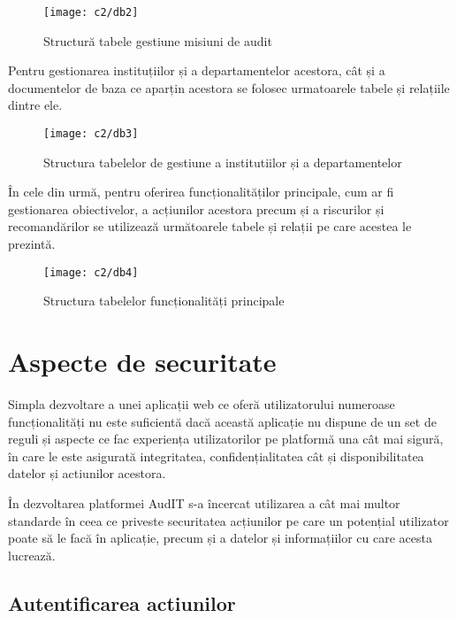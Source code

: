 \vspace{1cm}
\begin{figure}[h]
	\centering
	
	\texttt{[image: c2/db2]}
	\caption{Structură tabele gestiune misiuni de audit}
\end{figure}

\newpage
Pentru gestionarea instituțiilor și a departamentelor acestora, cât și a documentelor de baza ce aparțin acestora se folosec urmatoarele tabele și relațiile dintre ele.
\vspace{1cm}
\begin{figure}[h]
	\centering
	
	\texttt{[image: c2/db3]}
	\caption{Structura tabelelor de gestiune a institutiilor și a departamentelor}
\end{figure}

În cele din urmă, pentru oferirea funcționalităților principale, cum ar fi gestionarea obiectivelor, a acțiunilor acestora precum și a riscurilor și recomandărilor se utilizează următoarele tabele și relații pe care acestea le prezintă.

\vspace{1cm}
\begin{figure}[h]
	\centering
	
	\texttt{[image: c2/db4]}
	\caption{Structura tabelelor funcționalități principale}
\end{figure}

\section{Aspecte de securitate}

Simpla dezvoltare a unei aplicații web ce oferă utilizatorului numeroase funcționalități nu este suficientă dacă această aplicație nu dispune de un set de reguli și aspecte ce  fac experiența utilizatorilor pe platformă una cât mai sigură, în care le este asigurată integritatea, confidențialitatea cât și disponibilitatea datelor și actiunilor acestora.

În dezvoltarea platformei AudIT s-a încercat utilizarea a cât mai multor standarde în ceea ce priveste securitatea acțiunilor pe care un potențial utilizator poate să le facă în aplicație, precum și a datelor și informațiilor cu care acesta lucrează.

\subsection*{Autentificarea actiunilor}

